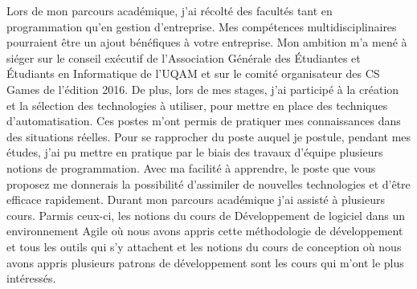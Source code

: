 \vfill
Lors de mon parcours académique, j'ai récolté des facultés tant en
programmation qu'en gestion d'entreprise. Mes compétences
multidisciplinaires pourraient être un ajout bénéfiques à votre entreprise. Mon
ambition m'a mené à siéger sur le conseil exécutif de l'Association
Générale des Étudiantes et Étudiants en Informatique de l'UQAM et sur le
comité organisateur des CS Games de l'édition 2016. De plus, lors de mes stages,
j'ai participé à la création et la sélection des technologies à utiliser, pour
mettre en place des techniques d'automatisation.
Ces postes m'ont permis de pratiquer mes connaissances
dans des situations réelles.
\vfill
Pour se rapprocher du poste auquel je postule, pendant mes études,
j'ai pu mettre en pratique par le biais des travaux d'équipe plusieurs notions
de programmation. Avec ma
facilité à apprendre, le poste que vous proposez me donnerais la possibilité
d'assimiler de nouvelles technologies et d'être efficace rapidement. Durant
mon parcours académique j'ai assisté à plusieurs cours. Parmis ceux-ci, les
notions du cours de Développement de logiciel dans un environnement Agile où
nous avons appris cette méthodologie de développement et tous les outils qui s'y
attachent et les notions du cours de conception où nous avons appris plusieurs
patrons de développement sont les cours qui m'ont le plus intéressés.
